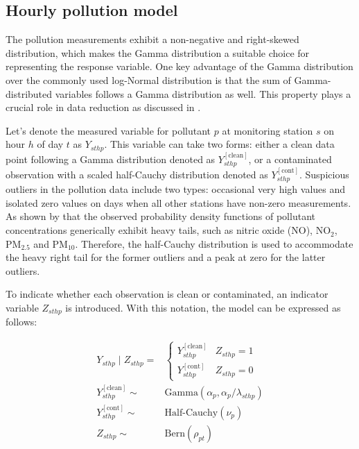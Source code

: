 \documentclass[
  12,
]{article}
\begin{document}
\hypertarget{hourly-pollution-model}{%
\subsection{Hourly pollution model}\label{hourly-pollution-model}}

The pollution measurements exhibit a non-negative and right-skewed
distribution, which makes the Gamma distribution a suitable choice for
representing the response variable. One key advantage of the Gamma
distribution over the commonly used log-Normal distribution is that the
sum of Gamma-distributed variables follows a Gamma distribution as well.
This property plays a crucial role in data reduction as discussed in
\textcite{Huang2022}.

Let's denote the measured variable for pollutant \(p\) at monitoring
station \(s\) on hour \(h\) of day \(t\) as \(Y_{sthp}\). This variable
can take two forms: either a clean data point following a Gamma
distribution denoted as \(Y_{sthp}^{[\mbox{clean}]}\), or a contaminated
observation with a scaled half-Cauchy distribution denoted as
\(Y_{sthp}^{[\mbox{cont}]}\). Suspicious outliers in the pollution data
include two types: occasional very high values and isolated zero values
on days when all other stations have non-zero measurements. As shown by
\textcite{He2022} that the observed probability density functions of
pollutant concentrations generically exhibit heavy tails, such as nitric
oxide (NO), NO\(_2\), PM\(_{2.5}\) and PM\(_{10}\). Therefore, the
half-Cauchy distribution is used to accommodate the heavy right tail for
the former outliers and a peak at zero for the latter outliers.

To indicate whether each observation is clean or contaminated, an
indicator variable \(Z_{sthp}\) is introduced. With this notation, the
model can be expressed as follows:

\begin{equation}\label{eqnPollutionhour}
\begin{aligned}
Y_{sthp} \mid Z_{sthp}  = & 
\begin{cases}
Y_{sthp}^{[\mbox{clean}]} &  Z_{sthp} =1 \\ 
Y_{sthp}^{[\mbox{cont}]} & Z_{sthp}=0
\end{cases} \\
Y_{sthp}^{[\mbox{clean}]} \sim & \mbox{Gamma}
\left( \alpha_p, \alpha_p / \lambda_{sthp} \right) \\
Y_{sthp}^{[\mbox{cont}]} \sim & \mbox{Half-Cauchy}(\nu_{p})\\
Z_{sthp} \sim & \mbox{Bern}(\rho_{pt})
\end{aligned}
\end{equation}
\end{document}
